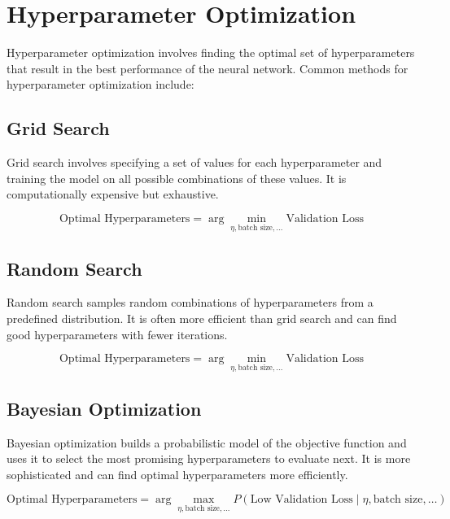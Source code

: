 \section{Hyperparameter Optimization}

    Hyperparameter optimization involves finding the optimal set of hyperparameters that result in the best performance of the neural network. Common methods for hyperparameter optimization include:

    \subsection{Grid Search}

        Grid search involves specifying a set of values for each hyperparameter and training the model on all possible combinations of these values. It is computationally expensive but exhaustive.

        \begin{equation}
        \text{Optimal Hyperparameters} = \arg \min_{\eta, \text{batch size}, \ldots} \text{Validation Loss}
        \end{equation}

    \subsection{Random Search}

        Random search samples random combinations of hyperparameters from a predefined distribution. It is often more efficient than grid search and can find good hyperparameters with fewer iterations.

        \begin{equation}
        \text{Optimal Hyperparameters} = \arg \min_{\eta, \text{batch size}, \ldots} \text{Validation Loss}
        \end{equation}

    \subsection{Bayesian Optimization}

        Bayesian optimization builds a probabilistic model of the objective function and uses it to select the most promising hyperparameters to evaluate next. It is more sophisticated and can find optimal hyperparameters more efficiently.

        \begin{equation}
        \text{Optimal Hyperparameters} = \arg \max_{\eta, \text{batch size}, \ldots} P(\text{Low Validation Loss} \mid \eta, \text{batch size}, \ldots)
        \end{equation}

